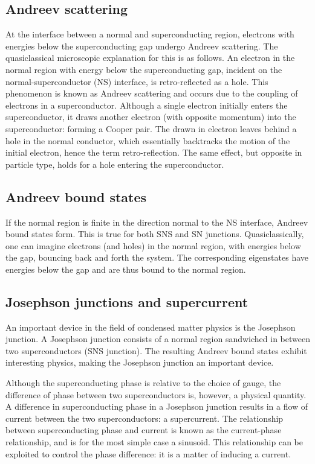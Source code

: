     \subsection{Andreev scattering}
        At the interface between a normal and superconducting region, electrons with energies below the superconducting gap undergo Andreev scattering.
        The quasiclassical microscopic explanation for this is as follows.
        An electron in the normal region with energy below the superconducting gap, incident on the normal-superconductor (NS) interface, is retro-reflected as a hole.
        This phenomenon is known as Andreev scattering and occurs due to the coupling of electrons in a superconductor.
        Although a single electron initially enters the superconductor, it draws another electron (with opposite momentum) into the superconductor: forming a Cooper pair.
        The drawn in electron leaves behind a hole in the normal conductor, which essentially backtracks the motion of the initial electron, hence the term retro-reflection.
        The same effect, but opposite in particle type, holds for a hole entering the superconductor.

    \subsection{Andreev bound states}
        If the normal region is finite in the direction normal to the NS interface, Andreev bound states form.
        This is true for both SNS and SN junctions.
        Quasiclassically, one can imagine electrons (and holes) in the normal region, with energies below the gap, bouncing back and forth the system.
        The corresponding eigenstates have energies below the gap and are thus bound to the normal region.

    \subsection{Josephson junctions and supercurrent}
        An important device in the field of condensed matter physics is the Josephson junction.
        A Josephson junction consists of a normal region sandwiched in between two superconductors (SNS junction).
        The resulting Andreev bound states exhibit interesting physics, making the Josephson junction an important device.

        Although the superconducting phase is relative to the choice of gauge, the difference of phase between two superconductors is, however, a physical quantity.
        A difference in superconducting phase in a Josephson junction results in a flow of current between the two superconductors: a supercurrent.
        The relationship between superconducting phase and current is known as the current-phase relationship, and is for the most simple case a sinusoid.
        This relationship can be exploited to control the phase difference: it is a matter of inducing a current.

